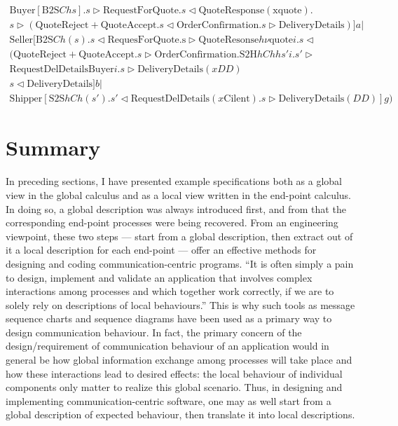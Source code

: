 \begin{equation*}
\begin{array}{c}
\text{Buyer}[\text{B2S}Chs].s \triangleright \text{RequestForQuote}.s \triangleleft \text{QuoteResponse}(\text{xquote}). \\
s \triangleright (\text{QuoteReject} + \text{QuoteAccept}.s \triangleleft \text{OrderConfirmation}.s \triangleright \text{DeliveryDetails})]a | \\
\text{Seller}[\text{B2S}Ch(s).s \triangleleft \text{RequesForQuote.s} \triangleright \text{QuoteResonse}h \nu \text{quote} i.s \triangleleft \\
 (\text{QuoteReject} + \text{QuoteAccept}.s \triangleright \text{OrderConfirmation}.\text{S2H}hChhs'i.s' \triangleright \\
\text{RequestDelDetailsBuyer}i.s \triangleright \text{DeliveryDetails}(xDD) \\
s \triangleleft \text{DeliveryDetails}]b|\\
\text{Shipper}[\text{S2S}hCh(s').s' \triangleleft \text{RequestDelDetails}(x\text{Cilent}).s \triangleright \text{DeliveryDetails}(DD)]g
)
\end{array}
\end{equation*}

\section{Summary}
\label{sec:formal-summary}

In preceding sections, I have presented example specifications both as a global view in the global calculus and as a local view written in the end-point calculus. In doing so, a global description was always introduced first, and from that the corresponding end-point processes were being recovered. From an engineering viewpoint, these two steps --- start from a global description, then extract out of it a local description for each end-point --- offer an effective methods for designing and coding communication-centric programs. ``It is often simply a pain to design, implement and validate an application that involves complex interactions among processes and which together work correctly, if we are to solely rely on descriptions of local behaviours.'' This is why such tools as message sequence charts and sequence diagrams have been used as a primary way to design communication behaviour. In fact, the primary concern of the design/requirement of communication behaviour of an application would in general be how global information exchange among processes will take place and how these interactions lead to desired effects: the local behaviour of individual components only matter to realize this global scenario. Thus, in designing and implementing communication-centric software, one may as well start from a global description of expected behaviour, then translate it into local descriptions. 

